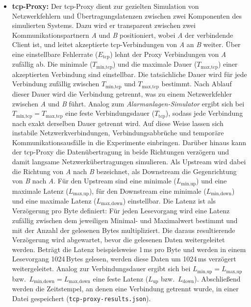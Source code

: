\begin{itemize}
	\item \textbf{\gls{tcp}-Proxy:} Der \gls{tcp}-Proxy dient zur gezielten Simulation von Netzwerkfehlern und Übertragungslatenzen zwischen zwei Komponenten des simulierten Systems. Dazu wird er transparent zwischen zwei Kommunikationspartnern \textit{A} und \textit{B} positioniert, wobei \textit{A} der verbindende Client ist, und leitet akzeptierte \gls{tcp}-Verbindungen von \textit{A} an \textit{B} weiter. Über eine einstellbare Fehlerrate ($E_{\text{tcp}}$) lehnt der Proxy Verbindungen von \textit{A} zufällig ab. Die minimale ($T_{\text{min,tcp}}$) und die maximale Dauer ($T_{\text{max,tcp}}$) einer akzeptierten Verbindung sind einstellbar. Die tatsächliche Dauer wird für jede Verbindung zufällig zwischen $T_{\text{min,tcp}}$ und $T_{\text{max,tcp}}$ bestimmt. Nach Ablauf dieser Dauer wird die Verbindung getrennt, was zu einem Netzwerkfehler zwischen \textit{A} und \textit{B} führt. Analog zum \textit{Alarmanlagen-Simulator} ergibt sich bei $T_{\text{min,tcp}} = T_{\text{max,tcp}}$ eine feste Verbindungsdauer ($T_{\text{tcp}}$), sodass jede Verbindung nach exakt derselben Dauer getrennt wird. Auf diese Weise lassen sich instabile Netzwerkverbindungen, Verbindungsabbrüche und temporäre Kommunikationsausfälle in die Experimente einbringen. Darüber hinaus kann der \gls{tcp}-Proxy die Datenübertragung in beide Richtungen verzögern und damit langsame Netzwerkübertragungen simulieren. Als Upstream wird dabei die Richtung von \textit{A} nach \textit{B} bezeichnet, als Downstream die Gegenrichtung von \textit{B} nach \textit{A}. Für den Upstream sind eine minimale ($L_{\text{min,up}}$) und eine maximale Latenz ($L_{\text{max,up}}$), für den Downstream eine minimale ($L_{\text{min,down}}$) und eine maximale Latenz ($L_{\text{max,down}}$) einstellbar. Die Latenz ist als Verzögerung pro Byte definiert: Für jeden Lesevorgang wird eine Latenz zufällig zwischen dem jeweiligen Minimal- und Maximalwert bestimmt und mit der Anzahl der gelesenen Bytes multipliziert. Die daraus resultierende Verzögerung wird abgewartet, bevor die gelesenen Daten weitergeleitet werden. Beträgt die Latenz beispielsweise 1\,ms pro Byte und werden in einem Lesevorgang 1024\,Bytes gelesen, werden diese Daten um 1024\,ms verzögert weitergeleitet. Analog zur Verbindungsdauer ergibt sich bei $L_{\text{min,up}} = L_{\text{max,up}}$ bzw.~$L_{\text{min,down}} = L_{\text{max,down}}$ eine feste Latenz ($L_{\text{up}}$ bzw.~$L_{\text{down}}$). Abschließend werden die Zeitstempel, an denen eine Verbindung getrennt wurde, in einer Datei gespeichert (\texttt{tcp-proxy-results.\allowbreak json}).


\end{itemize}
